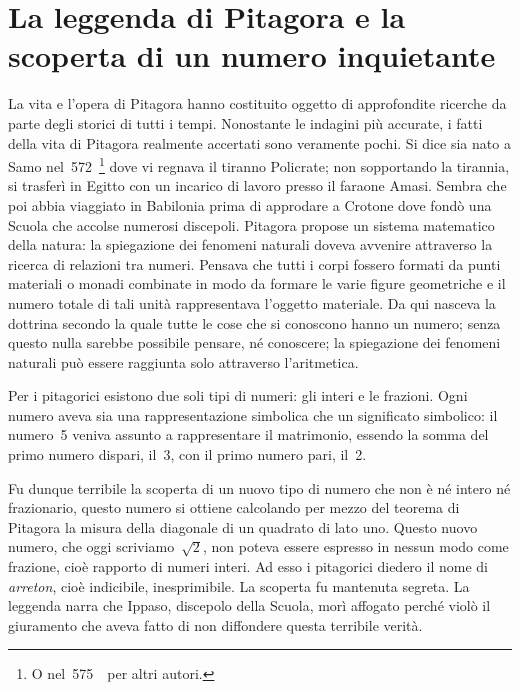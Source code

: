 
\section{La leggenda di Pitagora e la scoperta di un numero inquietante}

La vita e l'opera di Pitagora hanno costituito oggetto
di approfondite ricerche da parte degli storici di tutti i tempi.
Nonostante le indagini più accurate, i fatti della vita di Pitagora
realmente accertati sono veramente pochi. Si dice sia nato a Samo 
nel~572~\aC\footnote{O nel~575~\aC\ per altri autori.} dove vi regnava il 
tiranno Policrate; non sopportando la tirannia, si trasferì in Egitto con 
un incarico di lavoro presso il faraone Amasi. Sembra che poi abbia
viaggiato in Babilonia prima di approdare a Crotone dove fondò una
Scuola che accolse numerosi discepoli. Pitagora propose un sistema
matematico della natura: la spiegazione dei fenomeni naturali doveva
avvenire attraverso la ricerca di relazioni tra numeri. Pensava che
tutti i corpi fossero formati da punti materiali o monadi combinate in
modo da formare le varie figure geometriche e il numero totale di tali
unità rappresentava l'oggetto materiale. Da qui
nasceva la dottrina secondo la quale tutte le cose che si conoscono
hanno un numero; senza questo nulla sarebbe possibile pensare, né
conoscere; la spiegazione dei fenomeni naturali può essere raggiunta
solo attraverso l'aritmetica.

Per i pitagorici esistono due soli tipi di numeri: gli interi e le
frazioni. Ogni numero aveva sia una rappresentazione simbolica che un
significato simbolico: il numero~5 veniva assunto a rappresentare il
matrimonio, essendo la somma del primo numero dispari, il~3, con il
primo numero pari, il~2.

Fu dunque terribile la scoperta di un nuovo tipo di numero che non è
né intero né frazionario, questo numero si ottiene calcolando per
mezzo del teorema di Pitagora la misura della diagonale di un quadrato
di lato uno. Questo nuovo numero, che oggi scriviamo~\(\sqrt{2}\), non
poteva essere espresso in nessun modo come frazione, cioè rapporto di
numeri interi. Ad esso i pitagorici diedero il nome di
\emph{arreton}, cioè indicibile, inesprimibile. La scoperta fu
mantenuta segreta. La leggenda narra che Ippaso, discepolo della
Scuola, morì affogato perché violò il giuramento che aveva fatto
di non diffondere questa terribile verità.

